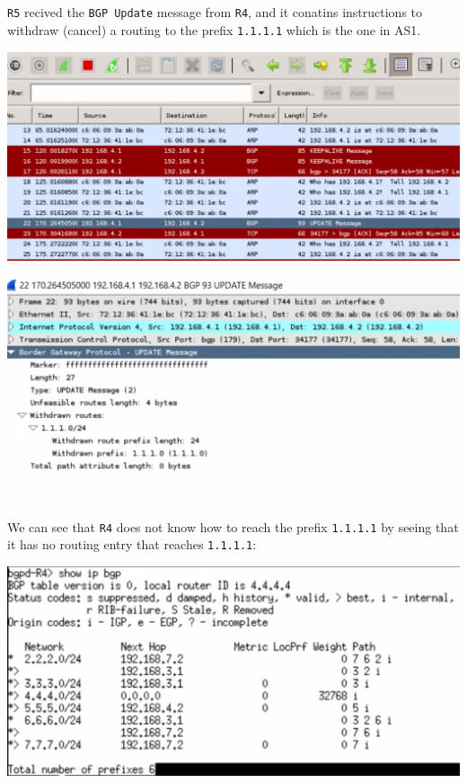 \subsection{}
\texttt{R5} recived the \texttt{BGP Update} message from \texttt{R4}, and it conatins
instructions to withdraw (cancel) a routing to the prefix \texttt{1.1.1.1} which is the one in AS1.
\begin{center}
    \includegraphics[width=1.2 \textwidth]{resources/q4-6.png}\centering
\end{center}

\begin{center}
    \includegraphics[width=1.2 \textwidth]{resources/q4-7.png}\centering
\end{center}

\subsection{}
We can see that \texttt{R4} does not know how to reach the prefix \texttt{1.1.1.1} by seeing that it has no
routing entry that reaches \texttt{1.1.1.1}:
\begin{center}
    \includegraphics[width=1.2 \textwidth]{resources/q4-8.png}\centering
\end{center}

